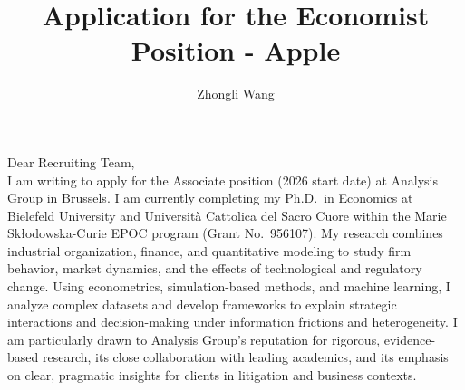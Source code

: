 \documentclass{nfr}
\title{Application for the Economist Position - Apple}
\author{Zhongli Wang}
\begin{document}

% 
% 
% 
% 


\maketitle


\noindent Dear Recruiting Team,\\[0.2cm]

I am writing to apply for the Associate position (2026 start date) at Analysis Group in Brussels. 
I am currently completing my Ph.D.\ in Economics at Bielefeld University and Università Cattolica del Sacro Cuore within the Marie Skłodowska-Curie EPOC program (Grant No.~956107). 
My research combines industrial organization, finance, and quantitative modeling to study firm behavior, market dynamics, and the effects of technological and regulatory change. 
Using econometrics, simulation-based methods, and machine learning, I analyze complex datasets and develop frameworks to explain strategic interactions and decision-making under information frictions and heterogeneity. 
I am particularly drawn to Analysis Group’s reputation for rigorous, evidence-based research, its close collaboration with leading academics, and its emphasis on clear, pragmatic insights for clients in litigation and business contexts.\\
\end{document}
